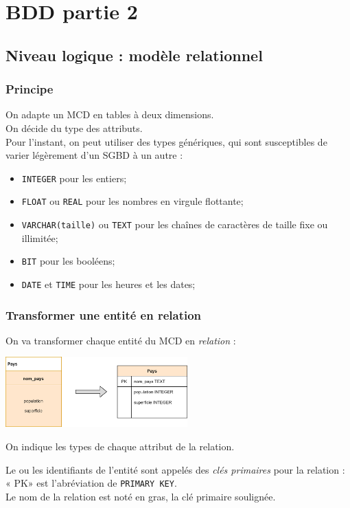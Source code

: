 \chapter{BDD partie 2}


\section{Niveau logique : modèle relationnel}
\subsection{Principe}
On adapte un MCD en tables à deux dimensions.\\
On décide du type des attributs.\\
Pour l'instant, on peut utiliser des types génériques, qui sont susceptibles de varier légèrement d'un SGBD à un autre :
\begin{itemize}
	\item	\texttt{INTEGER} pour les entiers;
	\item	\texttt{FLOAT} ou \texttt{REAL} pour les nombres en virgule flottante;
	\item	\texttt{VARCHAR(taille)} ou \texttt{TEXT} pour les chaînes de caractères de taille fixe ou illimitée;
	\item 	\texttt{BIT} pour les booléens;
	\item 	\texttt{DATE} et \texttt{TIME} pour les heures et les dates;
\end{itemize}



\subsection{Transformer une entité en relation}
On va transformer chaque entité du MCD en \textit{relation} :
\begin{center}
	\includegraphics[width=7cm]{img/entite_vers_relation}
\end{center}
On indique les types de chaque attribut de la relation.

Le ou les identifiants de l'entité sont appelés des \textit{clés primaires} pour la relation : « PK» est l'abréviation de \texttt{PRIMARY KEY}.\\
Le nom de la relation est noté en gras, la clé primaire soulignée.\\

